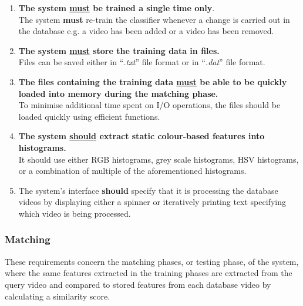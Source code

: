 \begin{enumerate}
    \item \textbf{The system \underline{must} be trained a single time only}.\\
    The system \textbf{must} re-train the classifier whenever a change is carried out in the database e.g. a video has been added or a video has been removed.
    
    \item \textbf{The system \underline{must} store the training data in files.}\\
    Files can be saved either in ``\textit{.txt}'' file format or in ``\textit{.dat}'' file format.
    
    \item \textbf{The files containing the training data \underline{must} be able to be quickly loaded into memory during the matching phase.}\\
    To minimise additional time spent on I/O operations, the files should be loaded quickly using efficient functions.
    
    \item \textbf{The system \underline{should} extract static colour-based features into histograms.}\\
    It should use either RGB histograms, grey scale histograms, HSV histograms, or a combination of multiple of the aforementioned histograms.
    
    \item The system's interface \textbf{should} specify that it is processing the database videos by displaying either a spinner or iteratively printing text specifying which video is being processed.
\end{enumerate}

\subsubsection{Matching}

These requirements concern the matching phases, or testing phase, of the system, where the same features extracted in the training phases are extracted from the query video and compared to stored features from each database video by calculating a similarity score.

